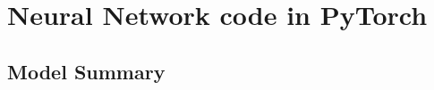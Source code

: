 \documentclass[
thesis  %
]{csthes}
\begin{document}



\appendix
\chapter{Neural Network code in PyTorch}

\section{Model Summary}
\end{document}
